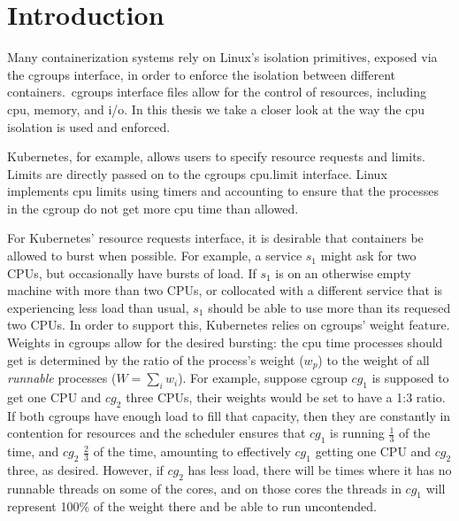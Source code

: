 
\section{Introduction}
\label{sec:introduction}

Many containerization systems rely on Linux's isolation primitives, exposed via
the cgroups interface, in order to enforce the isolation between different
containers.\ cgroups interface files allow for the control of resources,
including cpu, memory, and i/o. In this thesis we take a closer look at the way
the cpu isolation is used and enforced. 

Kubernetes\cite{kubernetes}, for example, allows users to specify resource
requests and limits. Limits are directly passed on to the cgroups cpu.limit
interface. Linux implements cpu limits using timers and accounting to ensure
that the processes in the cgroup do not get more cpu time than allowed. 

For Kubernetes' resource requests interface, it is desirable that containers be
allowed to burst when possible. For example, a service $s_1$ might ask for two
CPUs, but occasionally have bursts of load. If $s_1$ is on an otherwise empty
machine with more than two CPUs, or collocated with a different service that is
experiencing less load than usual, $s_1$ should be able to use more than its
requesed two CPUs. In order to support this, Kubernetes relies on cgroups'
weight feature. Weights in cgroups allow for the desired bursting: the cpu time
processes should get is determined by the ratio of the process's weight ($w_p$)
to the weight of all \textit{runnable} processes ($W = \sum_i w_i$). For
example, suppose cgroup $cg_1$ is supposed to get one CPU and $cg_2$ three CPUs,
their weights would be set to have a 1:3 ratio. If both cgroups have enough load
to fill that capacity, then they are constantly in contention for resources and
the scheduler ensures that $cg_1$ is running $\frac{1}{3}$ of the time, and
$cg_2$ $\frac{2}{3}$ of the time, amounting to effectively $cg_1$ getting one
CPU and $cg_2$ three, as desired. However, if $cg_2$ has less load, there will
be times where it has no runnable threads on some of the cores, and on those
cores the threads in $cg_1$ will represent 100\% of the weight there and be able
to run uncontended.


